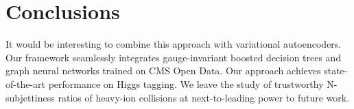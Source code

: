\section{Conclusions}\label{sec:conclusions}

It would be interesting to combine this approach with variational
autoencoders. Our framework seamlessly integrates gauge-invariant
boosted decision trees and graph neural networks trained on CMS Open
Data. Our approach achieves state-of-the-art performance on Higgs
tagging. We leave the study of trustworthy N-subjettiness ratios of
heavy-ion collisions at next-to-leading power to future work.

